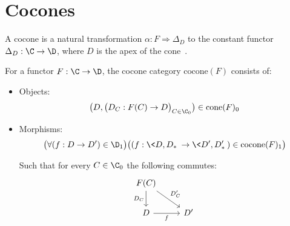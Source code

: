 \section{Cocones}

\begin{definition}[Cocone]
  A cocone is a natural transformation $\alpha: F \Rightarrow \Delta_D$ to the
	constant functor $\Delta_D:\C\to \D$, where $D$ is the apex of the
	cone~\parencite[p.~126]{leinster:basic_category_theory}.
\end{definition}

\begin{definition}
  For a functor $F:\C\to \D$, the cocone category $\mathrm{cocone}(F)$ consists
  of:

  \begin{itemize}
    \item Objects:
      \[\big(D, \big(D_C: F(C) \to D\big)_{C\in \C_0}\big)\in
        \mathrm{cone}(F)_0\]
    \item Morphisms:
      \[\big(\forall (f : D\to D')\in \D_1\big)
        \big((f:\<D, D_*\>\to \<D', D'_*\>)\in \mathrm{cocone}(F)_1\big)\]

      Such that for every $C\in \C_0$ the following commutes:
      \[\begin{tikzcd}[ampersand replacement=\&]
        {F(C)} \\
        D \& {D'}
        \arrow["{D_C}"', from=1-1, to=2-1]
        \arrow["{D'_C}", from=1-1, to=2-2]
        \arrow["f"', from=2-1, to=2-2]
      \end{tikzcd}\]
  \end{itemize}
\end{definition}